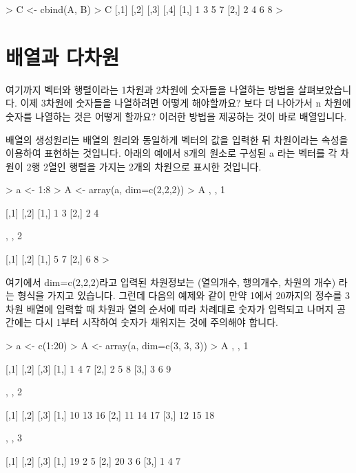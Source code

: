 \begin{Schunk}
\begin{Soutput}
> C <- cbind(A, B)
> C
     [,1] [,2] [,3] [,4]
[1,]    1    3    5    7
[2,]    2    4    6    8
> 
\end{Soutput}
\end{Schunk}



\section{배열과 다차원} 

여기까지 벡터와 행렬이라는 1차원과 2차원에 숫자들을 나열하는 방법을 살펴보았습니다.
이제 3차원에 숫자들을 나열하려면 어떻게 해야할까요? 
보다 더 나아가서 n 차원에 숫자를 나열하는 것은 어떻게 할까요?
이러한 방법을 제공하는 것이 바로 배열입니다. 

배열의 생성원리는 배열의 원리와 동일하게 벡터의 값을 입력한 뒤 차원이라는 속성을 이용하여 표현하는 것입니다.
아래의 예에서 8개의 원소로 구성된 a 라는 벡터를 각 차원이 2행 2열인 행렬을 가지는 2개의 차원으로 표시한 것입니다. 

\begin{Schunk}
\begin{Soutput}
> a <- 1:8
> A <- array(a, dim=c(2,2,2))
> A 
, , 1

     [,1] [,2]
[1,]    1    3
[2,]    2    4

, , 2

     [,1] [,2]
[1,]    5    7
[2,]    6    8
>
\end{Soutput}
\end{Schunk}

여기에서 dim=c(2,2,2)라고 입력된 차원정보는 (열의개수, 행의개수, 차원의 개수) 라는 형식을 가지고 있습니다. 
그런데 다음의 예제와 같이 만약 1에서 20까지의 정수를 3차원 배열에 입력할 때 차원과 열의 순서에 따라 차례대로 숫자가 입력되고 나머지 공간에는 다시 1부터 시작하여 숫자가 채워지는 것에 주의해야 합니다.


\begin{Schunk}
\begin{Soutput}

> a <- c(1:20)
> A <- array(a, dim=c(3, 3, 3))
> A
, , 1

     [,1] [,2] [,3]
[1,]    1    4    7
[2,]    2    5    8
[3,]    3    6    9

, , 2

     [,1] [,2] [,3]
[1,]   10   13   16
[2,]   11   14   17
[3,]   12   15   18

, , 3

     [,1] [,2] [,3]
[1,]   19    2    5
[2,]   20    3    6
[3,]    1    4    7
\end{Soutput}
\end{Schunk}

